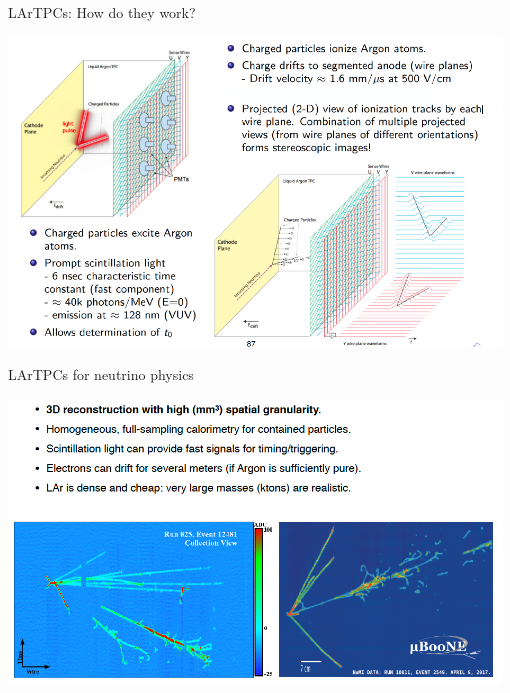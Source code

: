 \begin{frame}{LArTPCs: How do they work?}

\begin{center}
  \includegraphics[width=0.98\textwidth]{./images/3nu/future/lartpc_3}\\
\end{center}

\end{frame}

\begin{frame}{LArTPCs for neutrino physics}

\begin{center}
  \includegraphics[width=0.98\textwidth]{./images/3nu/future/lartpc_4}\\
\end{center}

\end{frame}

